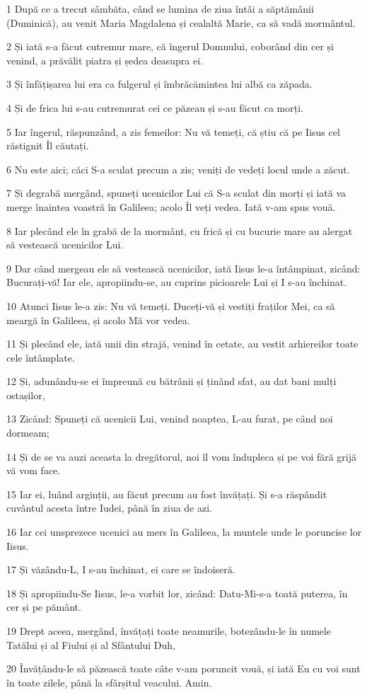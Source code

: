 \par 1 După ce a trecut sâmbăta, când se lumina de ziua întâi a săptămânii (Duminică), au venit Maria Magdalena și cealaltă Marie, ca să vadă mormântul.
\par 2 Și iată s-a făcut cutremur mare, că îngerul Domnului, coborând din cer și venind, a prăvălit piatra și ședea deasupra ei.
\par 3 Și înfățișarea lui era ca fulgerul și îmbrăcămintea lui albă ca zăpada.
\par 4 Și de frica lui s-au cutremurat cei ce păzeau și s-au făcut ca morți.
\par 5 Iar îngerul, răspunzând, a zis femeilor: Nu vă temeți, că știu că pe Iisus cel răstignit Îl căutați.
\par 6 Nu este aici; căci S-a sculat precum a zis; veniți de vedeți locul unde a zăcut.
\par 7 Și degrabă mergând, spuneți ucenicilor Lui că S-a sculat din morți și iată va merge înaintea voastră în Galileea; acolo Îl veți vedea. Iată v-am spus vouă.
\par 8 Iar plecând ele în grabă de la mormânt, cu frică și cu bucurie mare au alergat să vestească ucenicilor Lui.
\par 9 Dar când mergeau ele să vestească ucenicilor, iată Iisus le-a întâmpinat, zicând: Bucurați-vă! Iar ele, apropiindu-se, au cuprins picioarele Lui și I s-au închinat.
\par 10 Atunci Iisus le-a zis: Nu vă temeți. Duceți-vă și vestiți fraților Mei, ca să meargă în Galileea, și acolo Mă vor vedea.
\par 11 Și plecând ele, iată unii din strajă, venind în cetate, au vestit arhiereilor toate cele întâmplate.
\par 12 Și, adunându-se ei împreună cu bătrânii și ținând sfat, au dat bani mulți ostașilor,
\par 13 Zicând: Spuneți că ucenicii Lui, venind noaptea, L-au furat, pe când noi dormeam;
\par 14 Și de se va auzi aceasta la dregătorul, noi îl vom îndupleca și pe voi fără grijă vă vom face.
\par 15 Iar ei, luând arginții, au făcut precum au fost învățați. Și s-a răspândit cuvântul acesta între Iudei, până în ziua de azi.
\par 16 Iar cei unsprezece ucenici au mers în Galileea, la muntele unde le poruncise lor Iisus.
\par 17 Și văzându-L, I s-au închinat, ei care se îndoiseră.
\par 18 Și apropiindu-Se Iisus, le-a vorbit lor, zicând: Datu-Mi-s-a toată puterea, în cer și pe pământ.
\par 19 Drept aceea, mergând, învățați toate neamurile, botezându-le în numele Tatălui și al Fiului și al Sfântului Duh,
\par 20 Învățându-le să păzească toate câte v-am poruncit vouă, și iată Eu cu voi sunt în toate zilele, până la sfârșitul veacului. Amin.


